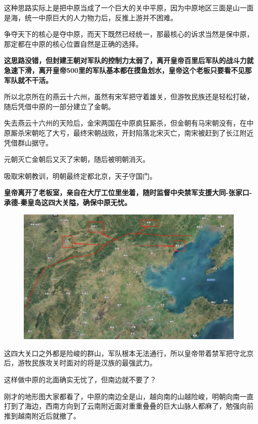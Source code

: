 \documentclass[UTF8, 11pt, oneside]{ctexart}
\newcommand{\zd}[1]{\textbf{\textcolor[RGB]{123,12,0}{#1}}} %
\begin{document}
这种思路实际上是把中原当成了一个巨大的关中平原，因为中原地区三面是山一面是海，统一中原巨大的人力物力后，反推上游并不困难。

争夺天下的核心是夺中原，而天下既然已经统一，那最核心的诉求当然是保中原，那定都在中原的核心位置自然是正确的选择。

\zd{这思路没错，但封建王朝对军队的控制力太弱了，离开皇帝百里后军队的战斗力就急速下滑，离开皇帝500里的军队基本都在摸鱼划水，皇帝这个老板只要看不见那军队就不干活。}

所以北京所在的燕云十六州，虽然有宋军把守着雄关，但游牧民族还是轻松打破，随后凭借中原的一部分建立了金朝。

失去燕云十六州的天险后，金宋两国在中原疯狂厮杀，但金朝有马宋朝没有，在中原厮杀宋朝吃了大亏，最终宋朝战败，开封陷落北宋灭亡，南宋被赶到了长江附近凭借群山据守。

元朝灭亡金朝后又灭了宋朝，随后被明朝消灭。

吸取宋朝教训，明朝最终定都北京，天子守国门。

\zd{皇帝离开了老板室，亲自在大厅工位里坐着，随时监督中央禁军支援大同-张家口-承德-秦皇岛这四大关隘，确保中原无忧。}

\begin{figure}[H]
    \centering
    \includegraphics[width=13cm]{2024-08-19-008.jpg}
\end{figure}

这四大关口之外都是险峻的群山，军队根本无法通行，所以皇帝带着禁军把守北京后，游牧民族攻关时面对的将是汉族的最强武力。

这样做中原的北面确实无忧了，但南边就不要了？

刚才的地形图大家都看了，中原的南边全是山，越向南的山越险峻，明朝向南一直打到了海边，西南方向到了云南附近面对重重叠叠的巨大山脉人都麻了，勉强向前推到越南附近后就撤了。
\end{document}
